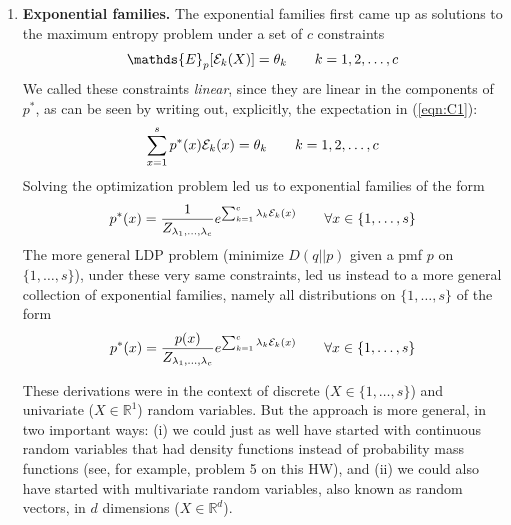 \documentclass[11pt]{report}
\begin{document}
\begin{enumerate}[1.]
    \item {\bf Exponential families.}
          The exponential families first came up as solutions to the maximum entropy problem under a set of $c$ constraints
          \begin{equation}
              \label{eqn:C1}
              \mathds{E}_p[{\cal E}_k(X)] = \theta_k \qquad k=1,2,\ldots, c
          \end{equation}
          We called these constraints {\em linear}, since they are linear in the components of $p^*$, as can be seen by writing out, explicitly, the expectation in (\ref{eqn:C1}):
          \[
              \sum_{x=1}^s p^*(x){\cal E}_k(x) = \theta_k \qquad k=1,2,\ldots, c
          \]
          Solving the optimization problem led us to exponential families of the form
          \[
              p^*(x) = \frac{1}{Z_{\lambda_1,\ldots,\lambda_c}}e^{\sum_{k=1}^c \lambda_k {\cal E}_k(x)}\qquad \forall x\in \{1, \ldots,s\}
          \]
          The more general LDP problem (minimize $D(q||p)$ given a pmf $p$ on $\{1,\ldots,s\}$), under these very same constraints, led us instead to a more general collection of exponential families, namely all distributions on $\{1, \ldots,s\}$ of the form
          \[
              p^*(x) = \frac{p(x)}{Z_{\lambda_1,\ldots,\lambda_c}}e^{\sum_{k=1}^c \lambda_k {\cal E}_k(x)}\qquad \forall x\in \{1, \ldots,s\}
          \]

          These derivations were in the context of discrete ($X \in \{1, \ldots,s\}$) and univariate ($X \in \mathds{R}^1$) random variables. But the approach is more general, in two important ways: (i) we could just as well have started with continuous random variables that had density functions instead of probability mass functions (see, for example, problem 5 on this HW), and (ii) we could also have started with multivariate random variables, also known as random vectors, in $d$ dimensions ($X\in\mathds{R}^d$).


\end{enumerate}
\end{document}
